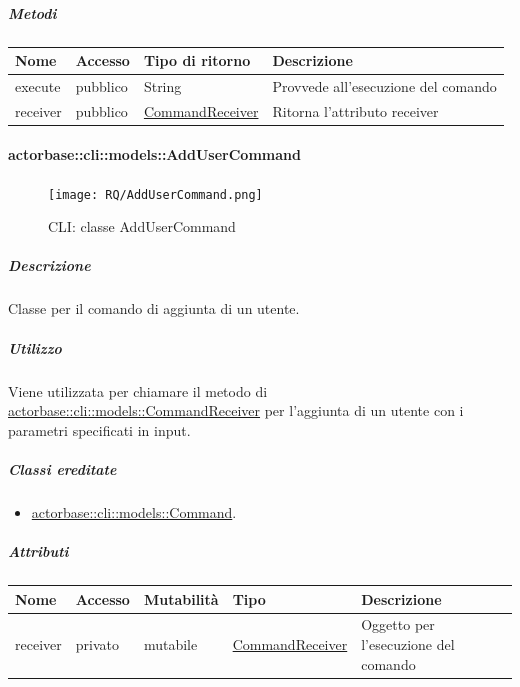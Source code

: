 \documentclass{scalatekids-article}
\begin{document}
\subparagraph{Metodi}

\begin{tabular}{| p{3cm} | p{1.5cm} | p{3.5cm} | p{9cm} |}
  \hline
  Nome & Accesso & Tipo di ritorno & Descrizione\\
  \hline
  execute & pubblico & String & Provvede all'esecuzione del comando\\
  \hline
  receiver & pubblico & \hyperref[sec:actorbase::cli::models::CommandReceiver]{CommandReceiver} & Ritorna l'attributo receiver\\
  \hline
\end{tabular}

\paragraph{actorbase::cli::models::AddUserCommand}
\label{sec:actorbase::cli::models::AddUserCommand}

\begin{figure}[H]
  \begin{center}
    \texttt{[image: RQ/AddUserCommand.png]}
    \caption{CLI: classe AddUserCommand}
  \end{center}
\end{figure}

\subparagraph{Descrizione}
Classe per il comando di aggiunta di un utente.

\subparagraph{Utilizzo}

Viene utilizzata per chiamare il metodo di
\hyperref[sec:actorbase::cli::models::CommandReceiver]{actorbase::cli::models::CommandReceiver} per l'aggiunta di un utente con i
parametri specificati in input.

\subparagraph{Classi ereditate}

\begin{itemize}
\item \hyperref[sec:actorbase::cli::models::Command]{actorbase::cli::models::Command}.
\end{itemize}

\subparagraph{Attributi}

\begin{tabular}{| p{1cm} | p{1.5cm} | p{2cm} | p{4cm} | p{8.5cm} |}
  \hline
  Nome & Accesso & Mutabilità & Tipo & Descrizione\\
  \hline
  receiver & privato & mutabile & \hyperref[sec:actorbase::cli::models::CommandReceiver]{CommandReceiver} & Oggetto per l'esecuzione del comando\\
  \hline
\end{tabular}
\end{document}
